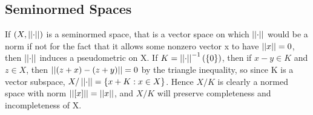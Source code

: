 


















\subsection{Seminormed Spaces}
If $(X,\left|\left| \cdot \right|\right|)$ is a seminormed space, that is a vector space on which $\left|\left| \cdot \right|\right|$ would be a norm if not for the fact that it allows some nonzero vector x to have $\left|\left| x \right|\right|=0$, then $\left|\left| \cdot \right|\right|$ induces a pseudometric on X. 
If $K=\left|\left| \cdot \right|\right|^{-1}(\{0\})$, then if $x-y \in K$ and $z \in X$, then $\left|\left| (z+x)-(z+y) \right|\right|=0$ by the triangle inequality, so since K is a vector subspace, $X/\left|\left| \cdot \right|\right|=\{x+K: x \in X\}$.
Hence $X/K$ is clearly a normed space with norm $\left|\left| [x] \right|\right| = \left|\left| x \right|\right|$, and $X/K$ will preserve completeness and incompleteness of X. 

